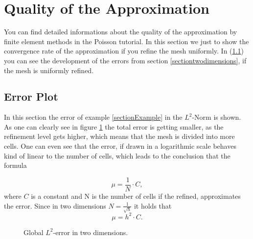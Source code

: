 \documentclass[a4paper, 11pt, twoside]{article}
\begin{document}
\section{Quality of the Approximation}
You can find detailed informations about the quality of the approximation by finite element methods in the Poisson tutorial. In this section we just to show the convergence rate of the approximation if you refine the mesh uniformly.
In (\ref{errorplot}) you can see the development of the errors from section \ref{sectiontwodimensions}, if the mesh is uniformly refined. \\


\subsection{Error Plot}\label{errorplot}
In this section the error of example \ref{sectionExample} in the $L^2$-Norm is shown. As one can clearly see in figure \ref{error_plots} the total error is getting smaller, as the refinement level gets higher, which means that the mesh is divided into more cells. One can even see that the error, if drawn in a logarithmic scale behaves kind of linear to the number of cells, which leads to the conclusion that the formula 

\begin{equation}
\mu = \frac{1}{N} \cdot C,
\end{equation}
where $C$ is a constant and N is the number of cells if the refined, approximates the error. Since in two dimensions $N = \frac {1}{\sqrt{h}}$ it holds that
\begin{equation}
\mu = h^2 \cdot C.
\end{equation}

\begin{figure}[h!]
	\centering
\caption{Global $L^2$-error in two dimensions.}
\label{error_plots}
\end{figure}

\newpage
\appendix




\printindex
\end{document}
